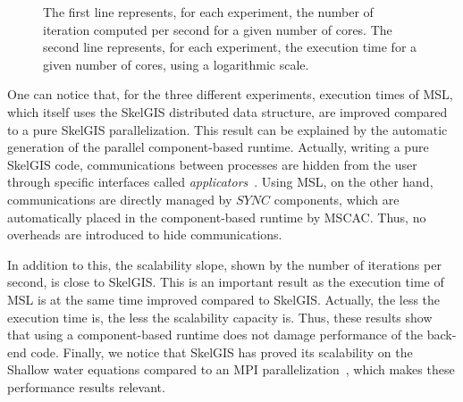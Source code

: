 \begin{figure}
\begin{center}
{
}
\end{center}
\caption{The first line represents, for each experiment, the number of iteration computed per second for a given number of cores. The second line represents, for each experiment, the execution time for a given number of cores, using a logarithmic scale.}
\label{fig:perfs}
\end{figure}

One can notice that, for the three different experiments, execution times of MSL, which itself uses the SkelGIS distributed data structure, are improved compared to a pure SkelGIS parallelization. This result can be explained by the automatic generation of the parallel component-based runtime. Actually, writing a pure SkelGIS code, communications between processes are hidden from the user through specific interfaces called \emph{applicators}~\cite{CPE:CPE3494}. Using MSL, on the other hand, communications are directly managed by $SYNC$ components, which are automatically placed in the component-based runtime by MSCAC. Thus, no overheads are introduced to hide communications.

In addition to this, the scalability slope, shown by the number of iterations per second, is close to SkelGIS. This is an important result as the execution time of MSL is at the same time improved compared to SkelGIS. Actually, the less the execution time is, the less the scalability capacity is. Thus, these results show that using a component-based runtime does not damage performance of the back-end code. Finally, we notice that SkelGIS has proved its scalability on the Shallow water equations compared to an MPI parallelization~\cite{CPE:CPE3494}, which makes these performance results relevant. 
